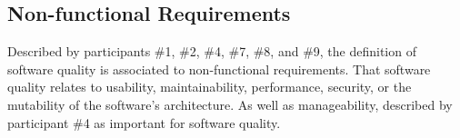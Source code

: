 




\subsection{Non-functional Requirements}
Described by participants \#1, \#2, \#4, \#7, \#8, and \#9, the definition of software quality is associated to non-functional requirements. That software quality relates to usability, maintainability, performance, security, or the mutability of the software's architecture. As well as manageability, described by participant \#4 as important for software quality. 

